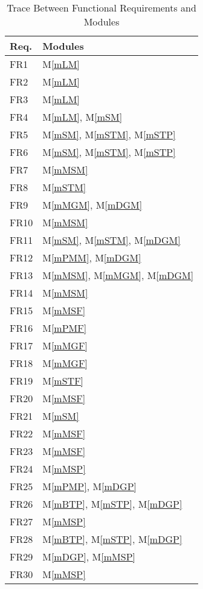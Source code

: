 \documentclass[12pt, titlepage]{article}
\newcommand{\mref}[1]{M\ref{#1}}
\begin{document}
\begin{table}[H]
\centering
\begin{tabular}{p{} p{}}
\toprule
\textbf{Req.} & \textbf{Modules}\\
\midrule
FR1 & \mref{mLM}\\
FR2 & \mref{mLM}\\
FR3 & \mref{mLM}\\
FR4 & \mref{mLM}, \mref{mSM}\\ 
FR5 & \mref{mSM}, \mref{mSTM}, \mref{mSTP}\\
FR6 & \mref{mSM}, \mref{mSTM}, \mref{mSTP}\\
FR7 & \mref{mMSM}\\ 
FR8 & \mref{mSTM}\\
FR9 & \mref{mMGM}, \mref{mDGM}\\
FR10 & \mref{mMSM}\\
FR11 & \mref{mSM}, \mref{mSTM}, \mref{mDGM}\\
FR12 & \mref{mPMM}, \mref{mDGM}\\
FR13 & \mref{mMSM}, \mref{mMGM}, \mref{mDGM}\\
FR14 & \mref{mMSM}\\ 
FR15 & \mref{mMSF}\\
FR16 & \mref{mPMF}\\
FR17 & \mref{mMGF} \\
FR18 & \mref{mMGF}\\
FR19 & \mref{mSTF}\\
FR20 & \mref{mMSF}\\
FR21 & \mref{mSM} \\
FR22 & \mref{mMSF}\\
FR23 & \mref{mMSF}\\
FR24 & \mref{mMSP}\\ 
FR25 & \mref{mPMP}, \mref{mDGP}\\
FR26 & \mref{mBTP}, \mref{mSTP}, \mref{mDGP}\\
FR27 & \mref{mMSP}\\ 
FR28 & \mref{mBTP}, \mref{mSTP}, \mref{mDGP}\\
FR29 & \mref{mDGP}, \mref{mMSP}\\
FR30 & \mref{mMSP}\\
\bottomrule
\end{tabular}
\caption{Trace Between Functional Requirements and Modules}
\label{TblFRT}
\end{table}

\newpage
\end{document}
